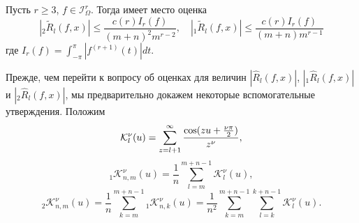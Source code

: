\begin{lemma}\label{l2.3}
Пусть $r\ge3$, $f\in \mathcal{ I}^r_\Omega$. Тогда имеет место оценка
\begin{equation*}
|_2\tilde R_l(f,x)|\le \frac{c(r)I_r(f)}{(m+n)^2m^{r-2}}, \quad |_1\tilde R_l(f,x)|\le \frac{c(r)I_r(f)}{(m+n)m^{r-1}}
\end{equation*}
где $I_r(f)=\int_{-\pi}^\pi|f^{(r+1)}(t)|dt$.
\end{lemma}

Прежде, чем перейти к вопросу об оценках для величин $|\hat R_l(f,x)|$, $|_1\hat R_l(f,x)|$ и $|_2\hat R_l(f,x)|$, мы предварительно докажем некоторые вспомогательные утверждения. Положим
\begin{equation}\label{2.23}
\mathcal{ K}_l^\nu(u)= \sum_{z=l+1}^{\infty}{\cos(zu+\frac{\nu\pi}{2})\over z^\nu},
\end{equation}
\begin{equation}\label{2.24}
_1\mathcal{ K}_{n,m}^\nu(u)=\frac1n \sum_{l=m}^{m+n-1}\mathcal{ K}_l^\nu(u),
\end{equation}
\begin{equation}\label{2.25}
_2\mathcal{ K}_{n,m}^\nu(u)=\frac1n \sum_{k=m}^{m+n-1} {_1}\mathcal{ K}_{n,k}^\nu(u)=
\frac1{n^2} \sum_{k=m}^{m+n-1}\sum_{l=k}^{k+n-1}\mathcal{ K}_l^\nu(u).
\end{equation}


